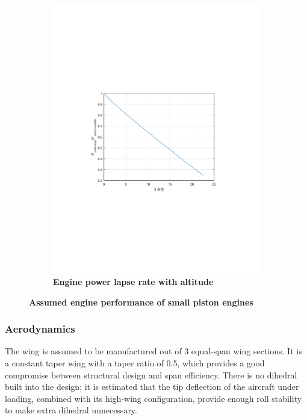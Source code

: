 \documentclass[journal]{aiaa-tc}%
\begin{document}
\begin{figure}[h!]
\begin{center}
\begin{subfigure}{0.45\textwidth}
            \includegraphics{P_shaftvsh_station}
             \caption{ \textbf{Engine power lapse rate with altitude} }
         \end{subfigure}
         \caption{ \textbf{Assumed engine performance of small piston engines} }
    \label{f:engineperf}
    \end{center}
\end{figure}

\subsubsection{Aerodynamics}

The wing is assumed to be manufactured out of 3 equal-span wing sections. It is a constant taper wing with a taper ratio of 0.5, which provides a good compromise between structural design and span efficiency. There is no dihedral built into the design; it is estimated that the tip deflection of the aircraft under loading, combined with its high-wing configuration, provide enough roll stability to make extra dihedral unnecessary.
\end{document}
